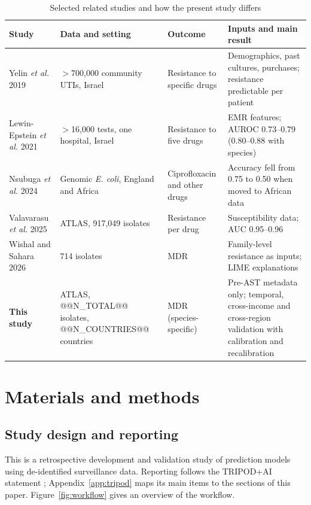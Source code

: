 \documentclass[11pt,a4paper]{article}
\newcommand{\sci}[1]{\textit{#1}}
\begin{document}
\begin{table}[t]
\caption{Selected related studies and how the present study differs}\label{tab:lit}
\centering\footnotesize\renewcommand{\arraystretch}{1.15}
\begin{tabularx}{\textwidth}{>{\raggedright\arraybackslash}p{2.6cm}>{\raggedright\arraybackslash}X>{\raggedright\arraybackslash}p{3.2cm}>{\raggedright\arraybackslash}X}
\toprule
Study & Data and setting & Outcome & Inputs and main result \\
\midrule
Yelin \textit{et al.} 2019 \cite{yelin2019} & $>$700{,}000 community UTIs, Israel & Resistance to specific drugs & Demographics, past cultures, purchases; resistance predictable per patient \\
Lewin-Epstein \textit{et al.} 2021 \cite{lewinepstein2021} & $>$16{,}000 tests, one hospital, Israel & Resistance to five drugs & EMR features; AUROC 0.73--0.79 (0.80--0.88 with species) \\
Nsubuga \textit{et al.} 2024 \cite{nsubuga2024} & Genomic \sci{E. coli}, England and Africa & Ciprofloxacin and other drugs & Accuracy fell from 0.75 to 0.50 when moved to African data \\
Valavarasu \textit{et al.} 2025 \cite{valavarasu2025} & ATLAS, 917{,}049 isolates & Resistance per drug & Susceptibility data; AUC 0.95--0.96 \\
Wishal and Sahara 2026 \cite{wishal2026} & 9{,}714 isolates & MDR & Family-level resistance as inputs; LIME explanations \\
\midrule
\textbf{This study} & ATLAS, @@N_TOTAL@@ isolates, @@N_COUNTRIES@@ countries & MDR (species-specific) & Pre-AST metadata only; temporal, cross-income and cross-region validation with calibration and recalibration \\
\bottomrule
\end{tabularx}
\end{table}

\section{Materials and methods}\label{sec:methods}
\subsection{Study design and reporting}
This is a retrospective development and validation study of prediction models using de-identified surveillance data. Reporting follows the TRIPOD+AI statement \cite{collins2024}; Appendix~\ref{app:tripod} maps its main items to the sections of this paper. Figure~\ref{fig:workflow} gives an overview of the workflow.
\end{document}
